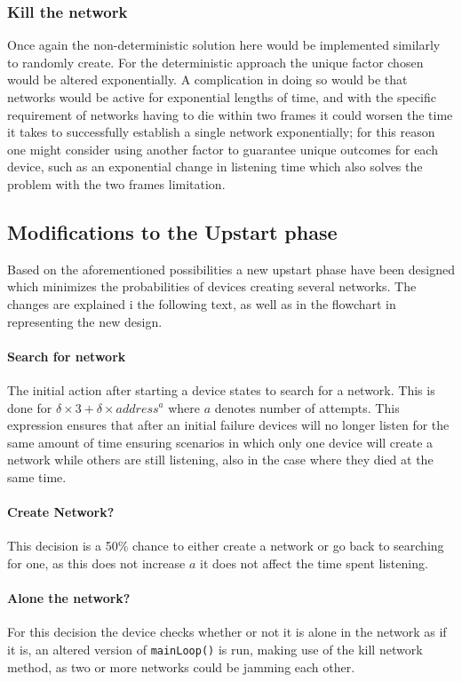 \subsubsection*{Kill the network}
Once again the non-deterministic solution here would be implemented similarly to randomly create.
For the deterministic approach the unique factor chosen would be altered exponentially.
A complication in doing so would be that networks would be active for exponential lengths of time, and with the specific requirement of networks having to die within two frames it could worsen the time it takes to successfully establish a single network exponentially; for this reason one might consider using another factor to guarantee unique outcomes for each device, such as an exponential change in listening time which also solves the problem with the two frames limitation.

\subsection{Modifications to the Upstart phase}
Based on the aforementioned possibilities a new upstart phase have been designed which minimizes the probabilities of devices creating several networks.
The changes are explained i the following text, as well as in the flowchart in  representing the new design.

\paragraph{Search for network}
The initial action after starting a device states to search for a network.
This is done for $\delta \times 3 + \delta \times address^a$ where $a$ denotes number of attempts. 
This expression ensures that after an initial failure devices will no longer listen for the same amount of time ensuring scenarios in which only one device will create a network while others are still listening, also in the case where they died at the same time.
\paragraph{Create Network?}
This decision is a 50\% chance to either create a network or go back to searching for one, as this does not increase $a$ it does not affect the time spent listening.
\paragraph{Alone the network?}
For this decision the device checks whether or not it is alone in the network as if it is, an altered version of \texttt{mainLoop()} is run, making use of the kill network method, as two or more networks could be jamming each other.
